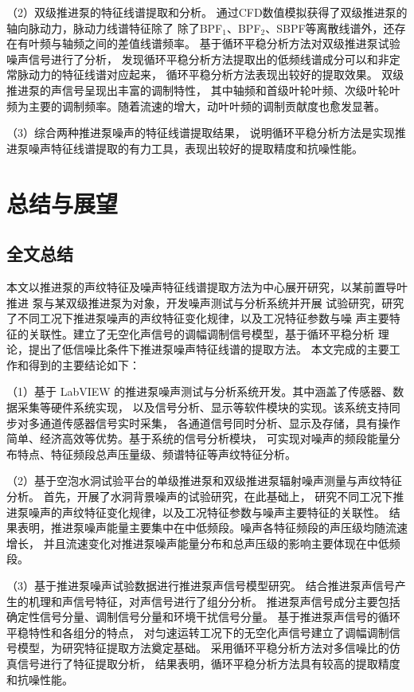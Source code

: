 （2）双级推进泵的特征线谱提取和分析。
通过CFD数值模拟获得了双级推进泵的轴向脉动力，脉动力线谱特征除了
除了BPF$_1$、BPF$_2$、SBPF等离散线谱外，还存在有叶频与轴频之间的差值线谱频率。
基于循环平稳分析方法对双级推进泵试验噪声信号进行了分析，
发现循环平稳分析方法提取出的低频线谱成分可以和非定常脉动力的特征线谱对应起来，
循环平稳分析方法表现出较好的提取效果。
双级推进泵的声信号呈现出丰富的调制特性，
其中轴频和首级叶轮叶频、次级叶轮叶频为主要的调制频率。随着流速的增大，动叶叶频的调制贡献度也愈发显著。

（3）综合两种推进泵噪声的特征线谱提取结果，
说明循环平稳分析方法是实现推进泵噪声特征线谱提取的有力工具，表现出较好的提取精度和抗噪性能。


\chapter{总结与展望}
\section{全文总结}
本文以推进泵的声纹特征及噪声特征线谱提取方法为中心展开研究，以某前置导叶推进
泵与某双级推进泵为对象，开发噪声测试与分析系统并开展
试验研究，研究了不同工况下推进泵噪声的声纹特征变化规律，以及工况特征参数与噪
声主要特征的关联性。建立了无空化声信号的调幅调制信号模型，基于循环平稳分析
理论，提出了低信噪比条件下推进泵噪声特征线谱的提取方法。
本文完成的主要工作和得到的主要结论如下：

（1）基于 LabVIEW 的推进泵噪声测试与分析系统开发。其中涵盖了传感器、数据采集等硬件系统实现，
以及信号分析、显示等软件模块的实现。该系统支持同步对多通道传感器信号实时采集，
各通道信号同时分析、显示及存储，具有操作简单、经济高效等优势。基于系统的信号分析模块，
可实现对噪声的频段能量分布特点、特征频段总声压量级、频谱特征等声纹特征分析。

（2）基于空泡水洞试验平台的单级推进泵和双级推进泵辐射噪声测量与声纹特征分析。
首先，开展了水洞背景噪声的试验研究，在此基础上，
研究不同工况下推进泵噪声的声纹特征变化规律，以及工况特征参数与噪声主要特征的关联性。
结果表明，推进泵噪声能量主要集中在中低频段。噪声各特征频段的声压级均随流速增长，
并且流速变化对推进泵噪声能量分布和总声压级的影响主要体现在中低频段。

（3）基于推进泵噪声试验数据进行推进泵声信号模型研究。
结合推进泵声信号产生的机理和声信号特征，对声信号进行了组分分析。
推进泵声信号成分主要包括确定性信号分量、调制信号分量和环境干扰信号分量。
基于推进泵声信号的循环平稳特性和各组分的特点，
对匀速运转工况下的无空化声信号建立了调幅调制信号模型，为研究特征提取方法奠定基础。
采用循环平稳分析方法对多信噪比的仿真信号进行了特征提取分析，
结果表明，循环平稳分析方法具有较高的提取精度和抗噪性能。

